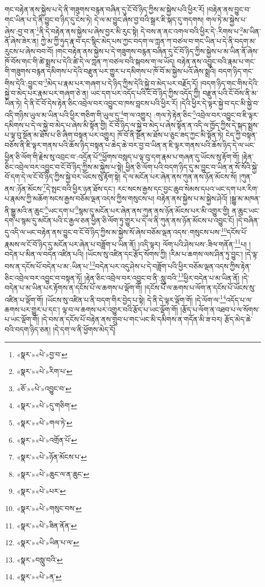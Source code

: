 གང་བརྟེན་ནས་སྐྱེས་པ་དེ་ནི་གཟུགས་བརྙན་བཞིན་དུ་ངོ་བོ་ཉིད་ཀྱིས་མ་སྐྱེས་པའི་ཕྱིར་རོ། །བརྟེན་ནས་བྱུང་བ་གང་ཡིན་པ་དེ་ནི་བྱུང་བ་ཉིད་དུ་ངེས་ཏེ། དེ་ལ་མ་བྱུང་ཞེས་བྱ་བའི་སྒྲར་ཇི་སྐད་དུ་གདགས། གལ་ཏེ་མ་སྐྱེས་པ་ཞེས་:བྱ་བ་ན་\footnote{«སྣར་»«པེ་»བྱ་བ་}ནི་དེ་བརྟེན་ནས་སྐྱེས་པ་ཞེས་བྱར་མི་རུང་སྟེ། དེ་བས་ན་ནང་འགལ་བའི་ཕྱིར་དེ་:རིགས་པ་\footnote{«སྣར་»«པེ་»རིག་པ་}མ་ཡིན་ནོ་ཞེས་ཟེར་ན། ཀྱེ་མ་ཀྱི་ཧུད་རྣ་བ་དང་སྙིང་མེད་པས་ཀྱང་བདག་ལ་ཀླན་ཀ་བཙལ་བ་གང་ཡིན་པ་དེ་ནི་བདག་མ་རུངས་པ་ཞེས་བབ་བོ། །གང་བརྟེན་ནས་སྐྱེས་པ་དེ་གཟུགས་བརྙན་བཞིན་དུ་ངོ་བོ་ཉིད་ཀྱིས་སྐྱེས་པ་མ་ཡིན་ནོ་ཞེས་ཁོ་བོས་གང་གི་ཚེ་སྨྲས་པ་དེའི་ཚེ་དེ་ལ་ཀླན་ཀ་བཙལ་བའི་སྐབས་ག་ལ་ཡོད། བརྟེན་ནས་འབྱུང་བའི་རྣམ་པ་གང་གི་གཟུགས་བརྙན་དམིགས་པ་དེའི་བརྫུན་པར་གྱུར་པ་དམིགས་པ་ཁོ་བོ་མ་སྐྱེས་པའོ་ཞེས་སྨྲའི། བདག་ཉིད་གང་གིས་དེའི་:བྱུང་བ་\footnote{«ཅོ་»«པེ་»འབྱུང་བ་}མེད་པ་རྣམ་པར་གཞག་པ་དེ་ཉིད་ཀྱིས་དེའི་སྐྱེ་བ་མེད་པར་བརྗོད་དོ། །བདག་ཉིད་གང་གིས་དེའི་སྐྱེ་བ་མེད་པར་རྣམ་པར་གཞག་ཅེ་ན། ཡང་དག་པར་འདོད་པའི་ངོ་བོ་ཉིད་ཀྱིས་འདོད་ཀྱི། བརྫུན་པའི་ངོ་བོས་ནི་མ་ཡིན་ཏེ། དེ་ནི་ངོ་བོ་དེས་རྟེན་ཅིང་འབྲེལ་བར་འབྱུང་བ་ཁས་བླངས་པའི་ཕྱིར་རོ། །དེའི་ཕྱིར་དེ་ལྟར་སྐྱེ་བ་དང་མི་སྐྱེ་བ་འདི་གཉིས་ཡུལ་མ་ཡིན་པའི་ཕྱིར་གཅིག་གི་ཡུལ་དུ་\footnote{«སྣར་»«པེ་»དུ་གཅིག་}ག་ལ་འགྱུར། :གལ་ཏེ་རྟེན་ཅིང་\footnote{«སྣར་»«པེ་»གལ་ཏེ་}འབྲེལ་བར་འབྱུང་བ་ཇི་ལྟར་དམིགས་པ་དེ་ལ་སྐྱེ་བ་མེད་པ་ཞེས་མི་སྟོན་གྱི། ངོ་བོ་ཉིད་ལ་སྐྱེ་བ་མེད་པ་ཞེས་སྟོན་ན་འདི་ལ་ཁྱོད་ཀྱིས་དེ་སྐད་སྨྲས་པ་ལྟ་བུ་སྔོན་མ་ཐོས་པ་ཅི་ཞིག་བསྟན་པར་འགྱུར། ཁོ་བོ་ནི་སྔོན་མ་ཐོས་པ་ཅུང་ཟད་ཀྱང་མི་སྟོན་ཏེ། ངེད་ཀྱི་བསྟན་བཅོས་ནི་ཇི་ལྟར་གནས་པའི་ཆོས་ཉིད་བསྟན་པ་ཆེད་ཆེ་བར་བྱ་བ་ཡིན་ན་ཇི་ལྟར་གནས་པའི་ཆོས་ཉིད་དེ་ལ་ཡང་ཕྱིན་ཅི་ལོག་གི་རྗེས་སུ་འབྲང་བ་:འདྲོན་པོ་\footnote{«སྣར་»«པེ་»འགྲོན་པོ་}ཕྱོགས་བསླད་པ་ལྟ་བུ་དག་རྣམ་པ་གཞན་དུ་ཡོངས་སུ་རྟོག་གོ། །རྟེན་ཅིང་འབྲེལ་བར་འབྱུང་བ་ངོ་བོ་ཉིད་ཀྱིས་མ་སྐྱེས་པ་སྟེ། ཕྱིན་ཅི་ལོག་པའི་བདག་ཉིད་དུ་མ་བྱུང་བ་ཡིན་ན་སོ་སོའི་སྐྱེ་བོ་དག་དེ་ལ་ངོ་བོ་ཉིད་ཀྱིས་སྐྱེ་བར་ཡོངས་སུ་རྟོག་སྟེ། དེ་ལ་མངོན་པར་ཞེན་ནས་ཀུན་ནས་ཉོན་མོངས་སོ། །ཀུན་ནས་:ཉོན་མོངས་\footnote{«སྣར་»«པེ་»ཉོན་མོངས་པ་}དེ་སྤང་བའི་ཕྱིར་ཉན་ཐོས་དང་། རང་སངས་རྒྱས་དང་བྱང་ཆུབ་སེམས་དཔའ་ཡང་དག་པར་རིག་པ་རྣམས་ཀྱི་མཆོག་སངས་རྒྱས་བཅོམ་ལྡན་འདས་ཀྱིས་གསུངས་པ། བརྟེན་ནས་སྐྱེས་པ་མ་སྐྱེས་ཤེའོ། །སྒྱུ་མ་མཁན་ནི་སྒྱུ་མའི་ན་ཆུང་\footnote{«སྣར་»«པེ་»ཆུང་ལ་ན་ཆུང་}ཡང་དག་པ་\footnote{«སྣར་»«པེ་»པར་}སྙམ་དུ་མངོན་པར་ཞེན་ནས་ཀུན་ནས་ཉོན་མོངས་པར་མི་འགྱུར་གྱི། ན་ཆུང་ཡང་དག་པ་སྙམ་དུ་མངོན་པའི་ང་རྒྱལ་ཅན་ཕྱིན་ཅི་ལོག་ཏུ་གྱུར་པ་དེ་ལ་ནི་ཀུན་ནས་ཉོན་མོངས་པ་འབྱུང་ངོ། །དེ་བཞིན་དུ་འདི་ལ་ཡང་བརྟེན་ནས་བྱུང་བ་ངོ་བོ་ཉིད་ཀྱིས་མ་སྐྱེས་སོ་ཞེས་བཅོམ་ལྡན་འདས་:གསུངས་པས་\footnote{«སྣར་»«པེ་»གསུང་བས་}དངོས་པོ་རྣམས་ལ་ངོ་བོ་ཉིད་དུ་མངོན་པར་ཞེན་པ་བཟློག་པ་ཡིན་ནོ། །འདི་ལྟར། ལོག་པའི་ཤེས་པས་:ཟིལ་གནོན་\footnote{«སྣར་»«པེ་»ཟིན་ནོན་}པ། །བདེན་པ་མིན་ལ་བདེན་འཛིན་པའི། །ཡོངས་སུ་འཛིན་དང་རྩོད་སོགས་ཀྱི། །རིམ་པ་ཆགས་ལས་ཤིན་ཏུ་བྱུང་། །དེ་ལྟ་བས་ན་དངོས་པོ་བདེན་པ་མ་:ཡིན་པ་\footnote{«སྣར་»«པེ་»ཡིན་པ་ལ་}བདེན་པར་འདུ་ཤེས་པ་དེ་བཟློག་པའི་ཕྱིར་བཅོམ་ལྡན་འདས་ཀྱིས་རྟེན་ཅིང་འབྲེལ་བར་འབྱུང་བ་བསྟན་ཏོ། །རྟེན་ཅིང་འབྲེལ་བར་འབྱུང་བ་ནི་:སླུ་བའི་\footnote{«སྣར་»བསླུ་བའི་}ཕྱིར་བདེན་པ་མ་ཡིན་ནོ། །དེ་བདེན་པ་མ་ཡིན་པར་རྟོགས་ན་དངོས་པོ་ལ་ཆགས་པ་ལྡོག་གོ། །དངོས་པོ་ལ་ཆགས་པ་ལོག་ན་དངོས་པོ་ཡོངས་སུ་འཛིན་པ་ལྡོག་གོ། །ཡོངས་སུ་འཛིན་པ་ནི་བདག་གིར་བྱེད་པ་སྟེ། དེ་ནི་དེ་ལྟར་ལྡོག་གོ། །དེ་ལོག་ལ་\footnote{«སྣར་»«པེ་»ན་}འདོད་པ་ལ་ཆགས་པར་གྱུར་པ་དང་། ལྟ་བ་ལ་ཆགས་པར་འགྱུར་བའི་རྩོད་པ་ཡང་ལྡོག་གོ། །རྩོད་པ་ལོག་ན་འཐབ་པ་ལ་སོགས་པ་ཡང་ལྡོག་གོ། །དེ་བས་ན་དངོས་པོ་བརྟེན་ནས་གྲུབ་པ་གང་ཡང་མི་དམིགས་ན་གདོན་མི་ཟ་བར། རྩོད་མེད་ཆེ་བའི་བདག་ཉིད་ཅན། །དེ་དག་ལ་ནི་ཕྱོགས་མེད་དོ། 